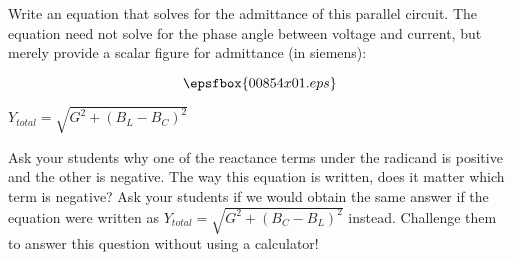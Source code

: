 

Write an equation that solves for the admittance of this parallel circuit.  The equation need not solve for the phase angle between voltage and current, but merely provide a scalar figure for admittance (in siemens):

$$\epsfbox{00854x01.eps}$$







$Y_{total} = \sqrt{G^2 + (B_L - B_C)^2}$







Ask your students why one of the reactance terms under the radicand is positive and the other is negative.  The way this equation is written, does it matter which term is negative?  Ask your students if we would obtain the same answer if the equation were written as $Y_{total} = \sqrt{G^2 + (B_C - B_L)^2}$ instead.  Challenge them to answer this question without using a calculator!




